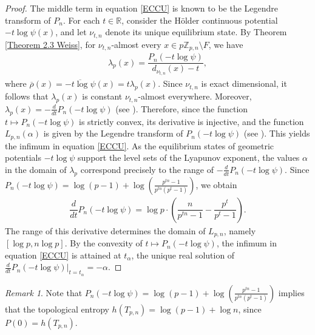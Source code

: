 \documentclass[11pt]{amsart}
\theoremstyle{remark}
\newtheorem{remark}[theorem]{Remark}
\numberwithin{equation}{section}
\newcommand{\R}{\mathbb{R}}
\newcommand{\Z}{\mathbb{Z}}
\begin{document}
\begin{proof}
The middle term in equation \eqref{ECCU} is known to be the Legendre transform of $P_{n}$. For each $t\in \R$, consider the H\"older continuous potential $-t\log\psi(x)$, and let $\nu_{t,n}$ denote its unique equilibrium state. By Theorem \ref{Theorem 2.3 Weiss}, for $\nu_{t,n}$-almost every $x\in p\Z_{p,n}\setminus F$, we have
    \begin{align}\label{EcuCorollaryWeiss}
        \lambda_{p}(x)=\dfrac{P
        _{n}(-t\log \psi)}{d_{\nu_{t,n}}(x)-t},
    \end{align} where $\overline{\rho}(x)=\overline{-t\log\psi}(x)=t\lambda_{p}(x)$. Since $\nu_{t,n}$ is exact dimensional, it follows that $\lambda_{p}(x)$ is constant $\nu_{t,n}$-almost everywhere. Moreover, $\lambda_{p}(x)=-\frac{d}{dt}P_{n}(-t\log\psi)$ (see \cite[Chapter 5]{pu}). Therefore, since the function $t\mapsto P_{n}\left(-t\log\psi\right)$ is strictly convex, its derivative is injective, and the function $L_{p,n}(\alpha)$ is given by the Legendre transform of $P_{n}(-t\log \psi)$ (see \cite{yh}). This yields the infimum in equation \eqref{ECCU}. As the equilibrium states of geometric potentials $-t\log \psi$ support the level sets of the Lyapunov exponent, the values $\alpha$ in the domain of $\lambda_p$ correspond precisely to the range of $-\frac{d}{dt}P_{n}(-t\log\psi)$. Since $P_{n}(-t\log\psi)=\log(p-1)+\log\left(\frac{p^{tn}-1}{p^{tn}(p^{t}-1)}\right)$, we obtain
\begin{align*}
    \dfrac{d}{dt}P_{n}(-t\log\psi)=\log p\cdot \left(\dfrac{n}{p^{tn}-1}-\dfrac{p^{t}}{p^{t}-1}\right).
\end{align*}The range of this derivative determines the domain of $L_{p,n}$, namely $[\log p,n\log p]$. By the convexity of $t\mapsto P_{n}(-t\log\psi)$, the infimum in equation \eqref{ECCU} is attained at $t_{\alpha}$, the unique real solution of $\frac{d}{dt}P_{n}(-t\log\psi)|_{t={t_{\alpha}}}=-\alpha$.
\end{proof}
\begin{remark}
    \noindent Note that $P_{n}(-t\log\psi)=\log(p-1)+\log\left(\frac{p^{tn}-1}{p^{tn}(p^{t}-1)}\right)$ implies that the topological entropy $h(T_{p,n})=\log(p-1)+\log n$, since $P(0)=h(T_{p,n})$.
\end{remark}
\end{document}
